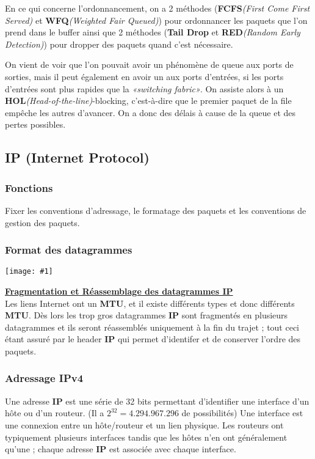 \documentclass{article}
\newcommand{\imgR}[2]{\begin{center}\texttt{[image: \#1]}\end{center}}
\begin{document}
En ce qui concerne l'ordonnancement, on a 2 méthodes (\textbf{FCFS}\textit{(First Come First Served)} et 
\textbf{WFQ}\textit{(Weighted Fair Queued)}) pour ordonnancer les paquets que l'on prend dans le buffer ainsi 
que 2 méthodes (\textbf{Tail Drop} et \textbf{RED}\textit{(Random Early Detection)}) pour dropper des paquets 
quand c'est nécessaire.

On vient de voir que l'on pouvait avoir un phénomène de queue aux ports de sorties, mais il peut également en
avoir un aux ports d'entrées, si les ports d'entrées sont plus rapides que la \textit{«switching fabric»}. On
assiste alors à un \textbf{HOL}\textit{(Head-of-the-line)}-blocking, c'est-à-dire que le premier paquet de la 
file empêche les autres d'avancer. On a donc des délais à cause de la queue et des pertes possibles.

\subsection{IP (Internet Protocol)}

\subsubsection{Fonctions}

Fixer les conventions d'adressage, le formatage des paquets et les conventions de gestion des paquets.

\subsubsection{Format des datagrammes}

\imgR{CN_076.png}{300}

\textbf{\underline{Fragmentation et Réassemblage des datagrammes IP}} \\

Les liens Internet ont un \textbf{MTU}, et il existe différents types et donc différents \textbf{MTU}. Dès lors
les trop gros datagrammes \textbf{IP} sont fragmentés en plusieurs datagrammes et ils seront réassemblés 
uniquement à la fin du trajet ; tout ceci étant assuré par le header \textbf{IP} qui permet d'identifer et de 
conserver l'ordre des paquets.

\subsubsection{Adressage IPv4}

Une adresse \textbf{IP} est une série de 32 bits permettant d'identifier une interface d'un hôte ou d'un routeur.
(Il a $2^{32} = 4.294.967.296$ de possibilités) Une interface est une connexion entre un hôte/routeur et un lien 
physique. Les routeurs ont typiquement plusieurs interfaces tandis que les hôtes n'en ont généralement qu'une ; 
chaque adresse \textbf{IP} est associée avec chaque interface. \\
\end{document}

